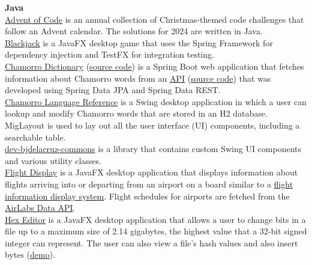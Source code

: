 \documentclass[10pt]{res} %
\begin{document}
\begin{resume}
{\bf Java} \\
 \href{https://bitbucket.org/bjpeterdelacruz/advent-of-code}{\color{blue}Advent of Code} is an annual collection of Christmas-themed code challenges that follow an Advent calendar. The solutions for 2024 are written in Java. \\
 \href{https://bitbucket.org/bjpeterdelacruz/blackjack}{\color{blue}Blackjack} is a JavaFX desktop game that uses the Spring Framework for dependency injection and TestFX for integration testing. \\
 \href{https://chamorro-dictionary-web-470180781716.us-west1.run.app}{\color{blue}Chamorro Dictionary} (\href{https://bitbucket.org/bjpeterdelacruz/chamorro-dictionary-web}{\color{blue}source code}) is a Spring Boot web application that fetches information about Chamorro words from an \href{https://chamorro-language-api-web-app.azurewebsites.net/api/entries}{\color{blue}API} (\href{https://bitbucket.org/bjpeterdelacruz/chamorro-language-api}{\color{blue}source code}) that was developed using Spring Data JPA and Spring Data REST. \\
 \href{https://bitbucket.org/bjpeterdelacruz/chamorro-language-reference}{\color{blue}Chamorro Language Reference} is a Swing desktop application in which a user can lookup and modify Chamorro words that are stored in an H2 database. MigLayout is used to lay out all the user interface (UI) components, including a searchable table. \\
 \href{https://bitbucket.org/bjpeterdelacruz/dev-bjdelacruz-commons}{\color{blue}dev-bjdelacruz-commons} is a library that contains custom Swing UI components and various utility classes. \\
 \href{https://bitbucket.org/bjpeterdelacruz/flight-display}{\color{blue}Flight Display} is a JavaFX desktop application that displays information about flights arriving into or departing from an airport on a board similar to a \href{https://en.wikipedia.org/wiki/Flight_information_display_system}{\color{blue}flight information display system}. Flight schedules for airports are fetched from the \href{https://airlabs.co}{\color{blue}AirLabs Data API}. \\
 \href{https://bitbucket.org/bjpeterdelacruz/hex-editor}{\color{blue}Hex Editor} is a JavaFX desktop application that allows a user to change bits in a file up to a maximum size of 2.14 gigabytes, the highest value that a 32-bit signed integer can represent. The user can also view a file's hash values and also insert bytes (\href{https://javafx-demos.s3.us-west-2.amazonaws.com/Hex_Viewer.mp4}{\color{blue}demo}). \\

\end{resume}
\end{document}
